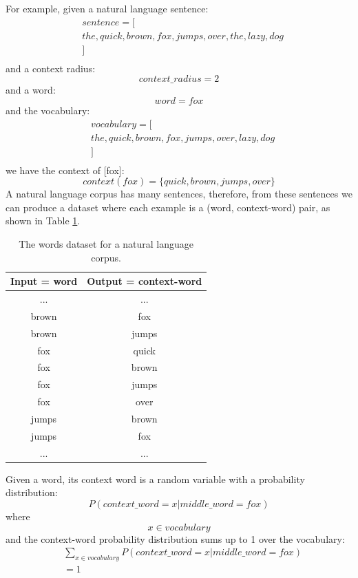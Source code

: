 \documentclass[conference]{IEEEtran}
\begin{document}
For example, given a natural language sentence:
\begin{align*}
	&sentence = [\\
	&the, quick, brown, fox, jumps, over, the, lazy, dog\\
	&]\\
\end{align*}
and a context radius:
\[context\_radius = 2\]
and a word:
\[word = fox\]
and the vocabulary:
\begin{align*}
	&vocabulary = [\\
	&the, quick, brown, fox, jumps, over, lazy, dog\\
	&]\\
\end{align*}
we have the context of [fox]:
\[ context(fox) = \{quick, brown, jumps, over\} \]
A natural language corpus has many sentences,
therefore, from these sentences we can produce a dataset where each example is a (word, context-word) pair,
as shown in Table \ref{tab:words}.
\begin{table}[!ht]
	\centering
	\caption{The words dataset for a natural language corpus.}
	\begin{tabular}{cc} \hline \rowcolor{blue!30}
		Input = word & Output = context-word \\ \hline
		... & ...       \\ \hline
		brown & fox \\ \hline
		brown & jumps \\ \hline
		fox & quick \\ \hline
		fox & brown \\ \hline
		fox & jumps \\ \hline
		fox & over \\ \hline
		jumps & brown \\ \hline
		jumps & fox \\ \hline
		... & ...       \\ \hline
	\end{tabular}
	\label{tab:words}
\end{table}
Given a word, its context word is a random variable with a probability distribution:
\[P(context\_word = x | middle\_word = fox)\]
where
\[x \in vocabulary\]
and the context-word probability distribution sums up to 1 over the vocabulary:
\begin{align*}
	&\sum_{x \in vocabulary}P(context\_word = x | middle\_word = fox)\\
	&= 1\\
\end{align*}
\end{document}
